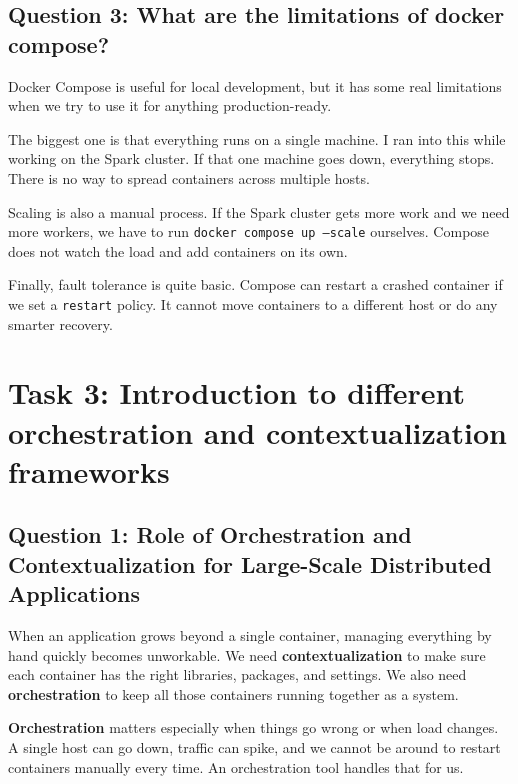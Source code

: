 \documentclass[11pt,a4paper]{article}
\begin{document}
\subsection{Question 3: What are the limitations of docker compose?}

Docker Compose is useful for local development, but it has some real limitations
when we try to use it for anything production-ready.

The biggest one is that everything runs on a single machine. I ran into this
while working on the Spark cluster. If that one machine goes down, everything
stops. There is no way to spread containers across multiple hosts.

Scaling is also a manual process. If the Spark cluster gets more work and we
need more workers, we have to run \texttt{docker compose up --scale} ourselves.
Compose does not watch the load and add containers on its own.

Finally, fault tolerance is quite basic. Compose can restart a crashed container
if we set a \texttt{restart} policy. It cannot move
containers to a different host or do any smarter recovery.

\section{Task 3: Introduction to different orchestration and contextualization frameworks}

\subsection{Question 1: Role of Orchestration and Contextualization
for Large-Scale Distributed Applications}

When an application grows beyond a single container, managing everything by
hand quickly becomes unworkable. We need \textbf{contextualization} to make sure each
container has the right libraries, packages, and settings. We also need \textbf{orchestration} to
keep all those containers running together as a system.

\textbf{Orchestration} matters especially when things go wrong or when load changes.
A single host can go down, traffic can spike, and we cannot be around to
restart containers manually every time. An orchestration tool handles that
for us.
\end{document}
